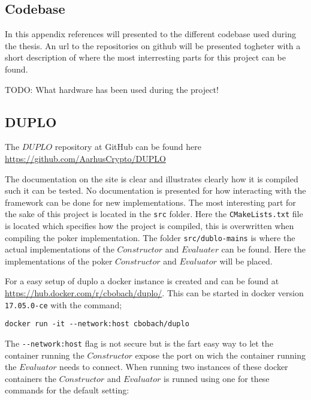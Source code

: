 \documentclass[twoside,11pt,openright]{report}
\newcommand{\todo}[1]{}
\renewcommand{\todo}[1]{{\color{red} TODO: {#1}} \\}
\begin{document}

\begin{appendices}
\chapter{Codebase}
In this appendix references will presented to the different codebase used during the thesis. An url to the repositories on github will be presented togheter with a short description of where the most interresting parts for this project can be found.

\bigskip

\todo{What hardware has been used during the project!}

\section{DUPLO}
\label{app:duplo}
The $DUPLO$ repository at GitHub can be found here \url{https://github.com/AarhusCrypto/DUPLO}

The documentation on the site is clear and illustrates clearly how it is compiled such it can be tested. No documentation is presented for how interacting with the framework can be done for new implementations. The most interesting part for the sake of this project is located in the \verb|src| folder. Here the \verb|CMakeLists.txt| file is located which specifies how the project is compiled, this is overwritten when compiling the poker implementation. The folder \verb|src/dublo-mains| is where the actual implementations of the $Constructor$ and $Evaluater$ can be found. Here the implementations of the poker $Constructor$ and $Evaluator$ will be placed.

\bigskip

For a easy setup of duplo a docker instance is created and can be found at \url{https://hub.docker.com/r/cbobach/duplo/}. This can be started in docker version \verb|17.05.0-ce| with the command;

\begin{center}
\begin{verbatim}
docker run -it --network:host cbobach/duplo
\end{verbatim}
\end{center}

The \verb|--network:host| flag is not secure but is the fart easy way to let the container running the $Constructor$ expose the port on wich the container running the $Evaluator$ needs to connect. When running two instances of these docker containers the $Constructor$ and $Evaluator$ is runned using one for these commands for the default setting:


\end{appendices}
\end{document}
